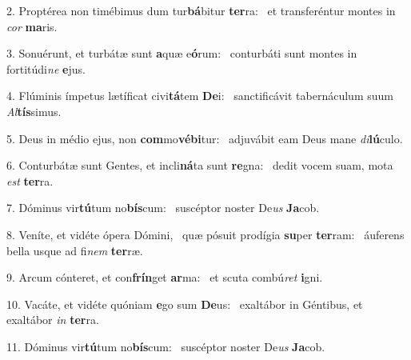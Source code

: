 2. Proptérea non timébimus dum tur\textbf{bá}bitur \textbf{ter}ra: \ast\  et transferéntur montes in \textit{cor} \textbf{ma}ris.\

3. Sonuérunt, et turbátæ sunt \textbf{a}quæ e\textbf{ó}rum: \ast\  conturbáti sunt montes in fortitúdi\textit{ne} \textbf{e}jus.\

4. Flúminis ímpetus lætíficat civi\textbf{tá}tem \textbf{De}i: \ast\  sanctificávit tabernáculum suum \textit{Al}\textbf{tís}simus.\

5. Deus in médio ejus, non \textbf{com}mo\textbf{vé}\textbf{bi}tur: \ast\  adjuvábit eam Deus mane \textit{di}\textbf{lú}culo.\

6. Conturbátæ sunt Gentes, et incli\textbf{ná}ta sunt \textbf{re}gna: \ast\  dedit vocem suam, mota \textit{est} \textbf{ter}ra.\

7. Dóminus vir\textbf{tú}tum no\textbf{bís}cum: \ast\  suscéptor noster De\textit{us} \textbf{Ja}cob.\

8. Veníte, et vidéte ópera Dómini, \dag\  quæ pósuit prodígia \textbf{su}per \textbf{ter}ram: \ast\  áuferens bella usque ad fi\textit{nem} \textbf{ter}ræ.\

9. Arcum cónteret, et con\textbf{frín}get \textbf{ar}ma: \ast\  et scuta combú\textit{ret} \textbf{i}gni.\

10. Vacáte, et vidéte quóniam \textbf{e}go sum \textbf{De}us: \ast\  exaltábor in Géntibus, et exaltábor \textit{in} \textbf{ter}ra.\

11. Dóminus vir\textbf{tú}tum no\textbf{bís}cum: \ast\  suscéptor noster De\textit{us} \textbf{Ja}cob.\

